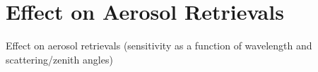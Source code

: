 \section{Effect on Aerosol Retrievals}

Effect on aerosol retrievals (sensitivity as a function of wavelength and scattering/zenith angles)
